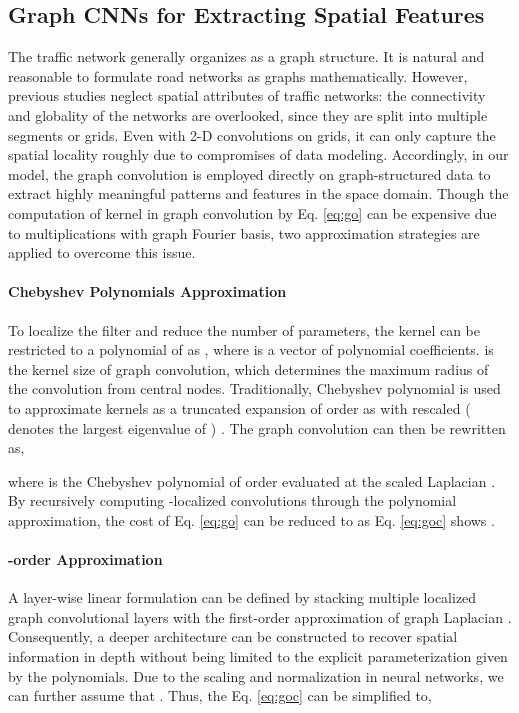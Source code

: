 \documentclass{article}
\begin{document}
\subsection{Graph CNNs for Extracting Spatial Features}
The traffic network generally organizes as a graph structure. It is natural and reasonable to formulate road networks as graphs mathematically. However, previous studies neglect spatial attributes of traffic networks: the connectivity and globality of the networks are overlooked, since they are split into multiple segments or grids. Even with 2-D convolutions on grids, it can only capture the spatial locality roughly due to compromises of data modeling. Accordingly, in our model, the graph convolution is employed directly on graph-structured data to extract highly meaningful patterns and features in the space domain. Though the computation of kernel  in graph convolution by Eq. \eqref{eq:go} can be expensive due to  multiplications with graph Fourier basis, two approximation strategies are applied to overcome this issue.

\paragraph{Chebyshev Polynomials Approximation}
To localize the filter and reduce the number of parameters, the kernel  can be restricted to a polynomial of  as , where  is a vector of polynomial coefficients.  is the kernel size of graph convolution, which determines the maximum radius of the convolution from central nodes. Traditionally, Chebyshev polynomial  is used to approximate kernels as a truncated expansion of order  as  with rescaled  ( denotes the largest eigenvalue of ) \cite{hammond2011wavelets}. The graph convolution can then be rewritten as,

where  is the Chebyshev polynomial of order  evaluated at the scaled Laplacian . By recursively computing -localized convolutions through the polynomial approximation, the cost of Eq. \eqref{eq:go} can be reduced to  as Eq. \eqref{eq:goc} shows \cite{defferrard2016convolutional}.

\paragraph{-order Approximation} 
A layer-wise linear formulation can be defined by stacking multiple localized graph convolutional layers with the first-order approximation of graph Laplacian \cite{kipf2016semi}. Consequently, a deeper architecture can be constructed to recover spatial information in depth without being limited to the explicit parameterization given by the polynomials. Due to the scaling and normalization in neural networks, we can further assume that . Thus, the Eq. \eqref{eq:goc} can be simplified to, 
\end{document}
